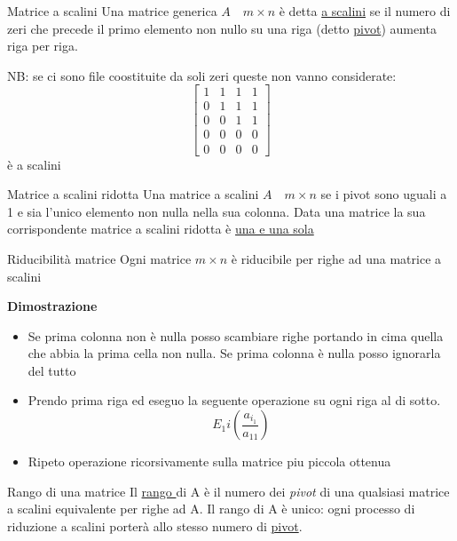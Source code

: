 \begin{definizione}{Matrice a scalini}
	Una matrice generica $A \quad m \times n$ è detta \underline{a scalini} se il numero di zeri che precede il primo elemento non nullo su una riga (detto \underline{pivot}) aumenta riga per riga.
\end{definizione}

NB: se ci sono file coostituite da soli zeri queste non vanno considerate:
\[
	\begin{bmatrix}
		1 & 1 & 1 & 1 \\
		0 & 1 & 1 & 1 \\
		0 & 0 & 1 & 1 \\
		0 & 0 & 0 & 0 \\
		0 & 0 & 0 & 0
	\end{bmatrix}
\]
è a scalini

\begin{definizione}{Matrice a scalini ridotta}
	Una matrice a scalini $ A \quad m \times n$ se i pivot sono uguali a 1 e sia l'unico elemento non nulla nella sua colonna. Data una matrice la sua corrispondente matrice a scalini ridotta è \underline{una e una sola}
\end{definizione}

\begin{teorema}{Riducibilità matrice}
	Ogni matrice $m \times n$ è riducibile per righe ad una matrice a scalini
\end{teorema}

\textbf{Dimostrazione}
\begin{itemize}
	\item Se prima colonna non è nulla posso scambiare righe portando in cima quella che abbia la prima cella non nulla. Se prima colonna è nulla posso ignorarla del tutto
	\item Prendo prima riga ed eseguo la seguente operazione su ogni riga al di sotto.
	      \[
		      E_1i \left( \frac{a_{i_1}}{a_{11}} \right)
	      \]
	\item Ripeto operazione ricorsivamente sulla matrice piu piccola ottenua
\end{itemize}

\begin{definizione}{Rango di una matrice}
	Il \underline{rango }di A è il numero dei \textit{pivot} di una qualsiasi matrice a scalini equivalente per righe ad A. Il rango di A è unico: ogni processo di riduzione a scalini porterà allo stesso numero di \underline{pivot}.
\end{definizione}


